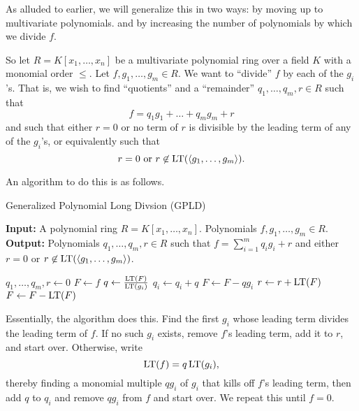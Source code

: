 As alluded to earlier, we will generalize this in two ways:
by moving up to multivariate polynomials.
and by increasing the number of polynomials by which we divide $f$.

So let $R = K[x_1, \ldots, x_n]$ be a multivariate polynomial ring over a field $K$ with a monomial order $\leq$.
Let $f, g_1, \ldots, g_m \in R$.
We want to ``divide'' $f$ by each of the $g_i$'s.
That is, we wish to find ``quotients'' and a ``remainder'' $q_1, \ldots, q_m, r \in R$ such that
\begin{equation*}
  f = q_1g_1 + \ldots + q_m g_m + r
\end{equation*}
and such that either $r = 0$ or no term of $r$ is divisible by the leading term of any of the $g_i$'s,
or equivalently such that
\[ r = 0 \text{ or } r \not\in \operatorname{LT}(\left\langle g_1, \ldots, g_m \right\rangle). \]

An algorithm to do this is as follows.
\begin{center}
  \begin{algorithm}
    \caption{Generalized Polynomial Long Divsion (GPLD)}
    {\bf Input:} A polynomial ring $R = K[x_1, \ldots, x_n]$. Polynomials $f, g_1, \ldots, g_m \in R$. \\
    {\bf Output:} Polynomials $q_1, \ldots, q_m, r \in R$ such that $f = \sum_{i=1}^m q_i g_i + r$ and either $r = 0$ or $r \not\in \operatorname{LT}(\left\langle g_1, \ldots, g_m \right\rangle)$.
    \begin{algorithmic}[1]
      \State $q_1, \ldots, q_m, r \gets 0$
      \State $F \gets f$
            \State $q \gets \frac {\operatorname{LT}(F)} {\operatorname{LT}(g_i)}$
            \State $q_i \gets q_i + q$
            \State $F \gets F - qg_i$
            \State {}
          \EndIf
        \EndFor
        \State $r \gets r + \operatorname{LT}(F)$
        \State $F \gets F - \operatorname{LT}(F)$
      \EndWhile
    \end{algorithmic}
  \end{algorithm}
\end{center}

Essentially, the algorithm does this.
Find the first $g_i$ whose leading term divides the leading term of $f$.
If no such $g_i$ exists, remove $f$'s leading term, add it to $r$, and start over.
Otherwise, write
  \[ \operatorname{LT}(f) = q\operatorname{LT}(g_i), \]
thereby finding a monomial multiple $qg_i$ of $g_i$ that kills off $f$'s leading term,
then add $q$ to $q_i$ and remove $qg_i$ from $f$ and start over.
We repeat this until $f = 0$.

